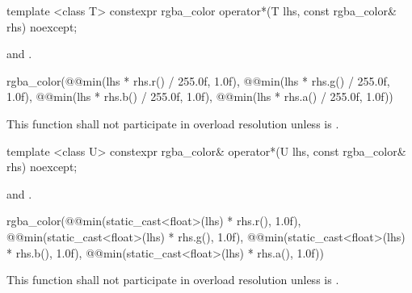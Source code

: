 %
\begin{itemdecl}
template <class T>
constexpr rgba_color operator*(T lhs, const rgba_color& rhs) noexcept;
\end{itemdecl}
\begin{itemdescr}
\pnum
\requires
{} and .

\pnum
\returns
\begin{codeblock}
rgba_color(@\stdqualifier{}@min(lhs * rhs.r() / 255.0f, 1.0f), 
  @\stdqualifier{}@min(lhs * rhs.g() / 255.0f, 1.0f),
  @\stdqualifier{}@min(lhs * rhs.b() / 255.0f, 1.0f),
  @\stdqualifier{}@min(lhs * rhs.a() / 255.0f, 1.0f))
\end{codeblock}

\pnum
\remarks
This function shall not participate in overload resolution unless  is .
\end{itemdescr}

%
\begin{itemdecl}
template <class U>
constexpr rgba_color& operator*(U lhs, const rgba_color& rhs) noexcept;
\end{itemdecl}
\begin{itemdescr}
\pnum
\requires
{} and .

\pnum
\returns
\begin{codeblock}
rgba_color(@\stdqualifier{}@min(static_cast<float>(lhs) * rhs.r(), 1.0f),
  @\stdqualifier{}@min(static_cast<float>(lhs) * rhs.g(), 1.0f),
  @\stdqualifier{}@min(static_cast<float>(lhs) * rhs.b(), 1.0f),
  @\stdqualifier{}@min(static_cast<float>(lhs) * rhs.a(), 1.0f))
\end{codeblock}

\pnum
\remarks
This function shall not participate in overload resolution unless  is .
\end{itemdescr}
